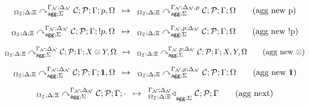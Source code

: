 
\[
\trans{
   \derstatea{\Delta}{\Xi}{\gammanew}{\deltanew}{\Sigma}{\lstack{C};
      \lstack{P}}{p, \Omega}
}
{
   \derstatea{\Delta}{\Xi}{\gammanew}{\deltanew, p}{\Sigma}{\lstack{C};
      \lstack{P}}{\Omega}
} \tag{agg new p}
\]

\[
\trans{
   \derstatea{\Delta}{\Xi}{\gammanew}{\deltanew}{\Sigma}{\lstack{C};
      \lstack{P}}{\bang p, \Omega}
}
{
   \derstatea{\Delta}{\Xi}{\gammanew, p}{\deltanew}{\Sigma}{\lstack{C};
      \lstack{P}}{\Omega}
} \tag{agg new \bang p}
\]

\[
\trans{
   \derstatea{\Delta}{\Xi}{\gammanew}{\deltanew}{\Sigma}{\lstack{C};
      \lstack{P}}{X \otimes Y, \Omega}
}
{
   \derstatea{\Delta}{\Xi}{\gammanew, p}{\deltanew}{\Sigma}{\lstack{C};
      \lstack{P}}{X, Y, \Omega}
} \tag{agg new $\otimes$}
\]

\[
\trans{
   \derstatea{\Delta}{\Xi}{\gammanew}{\deltanew}{\Sigma}{\lstack{C};
      \lstack{P}}{\one, \Omega}
}
{
   \derstatea{\Delta}{\Xi}{\gammanew, p}{\deltanew}{\Sigma}{\lstack{C};
      \lstack{P}}{\Omega}
} \tag{agg new $\one$}
\]

\[
\trans{
   \derstatea{\Delta}{\Xi}{\gammanew}{\deltanew}{\Sigma}{\lstack{C};
      \lstack{P}}{\cdot}
}
{
   \contstatea{\Delta}{\lstack{C} ; \lstack{P}}{\Gamma}{\Sigma}
} \tag{agg next}
\]
